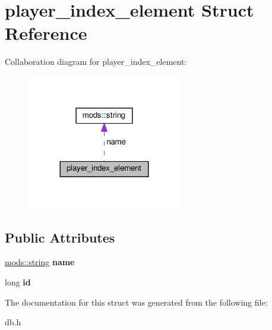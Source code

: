 \hypertarget{structplayer__index__element}{}\section{player\+\_\+index\+\_\+element Struct Reference}
\label{structplayer__index__element}


Collaboration diagram for player\+\_\+index\+\_\+element\+:\nopagebreak
\begin{figure}[H]
\begin{center}
\leavevmode
\includegraphics[width=191pt]{structplayer__index__element__coll__graph}
\end{center}
\end{figure}
\subsection*{Public Attributes}
\begin{DoxyCompactItemize}
\item 
\mbox{\label{structplayer__index__element_a3deb02912a0e16a6ebc69c305c6d674e}} 
\hyperlink{structmods_1_1string}{mods\+::string} {\bfseries name}
\item 
\mbox{\label{structplayer__index__element_ad502cad2a620a45b4565a41e15e2bea6}} 
long {\bfseries id}
\end{DoxyCompactItemize}


The documentation for this struct was generated from the following file\+:\begin{DoxyCompactItemize}
\item 
db.\+h\end{DoxyCompactItemize}
